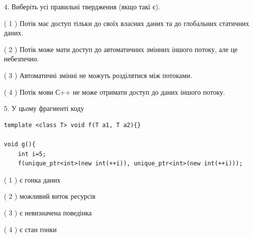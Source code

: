 \documentclass[12pt, ukrainian]{article}
\begin{document}
\begin {large}
{%
4. Виберіть усі правильні твердження (якщо такі є).\par
\vspace{2mm}

( 1 ) Потік має доступ тільки до своїх власних даних та до глобальних статичних даних.%

( 2 ) Потік може мати доступ до автоматичних змінних іншого потоку, але це небезпечно.%

( 3 ) Автоматичні змінні не можуть розділятися між потоками.%

( 4 ) Потік мови С++ не може отримати доступ до даних іншого потоку.%


5. У цьому фрагменті коду
\begin{verbatim}
template <class T> void f(T a1, T a2){}

void g(){
    int i=5;
    f(unique_ptr<int>(new int(++i)), unique_ptr<int>(new int(++i)));
\end{verbatim}

( 1 ) є гонка даних%

( 2 ) можливий виток ресурсів%

( 3 ) є невизначена поведінка%

( 4 ) є стан гонки%
}
\end {large}
\end{document}
